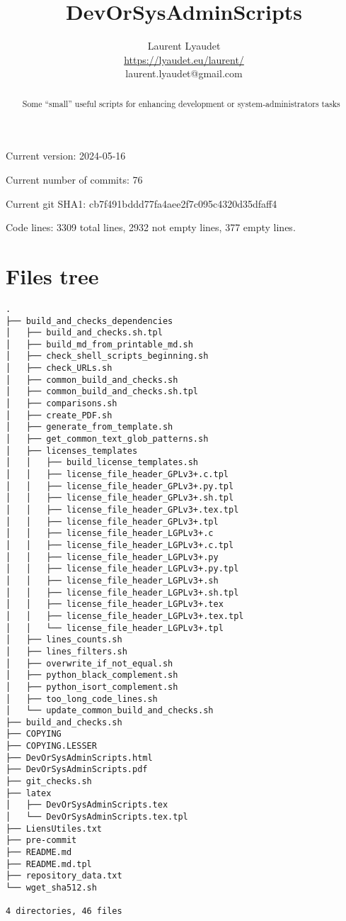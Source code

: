 \documentclass{article}
\begin{document}
\author{
  Laurent Lyaudet\\
  \url{https://lyaudet.eu/laurent/}\\
  laurent.lyaudet@gmail.com
}
\title{DevOrSysAdminScripts}

\maketitle
\begin{abstract}
Some ``small'' useful scripts
for enhancing development or system-administrators tasks
\end{abstract}

Current version: 2024-05-16

Current number of commits: 76

Current git SHA1: cb7f491bddd77fa4aee2f7c095c4320d35dfaff4

Code lines: 3309 total lines, 2932 not empty lines, 377 empty lines.

\section{Files tree}
\label{section:tree}

\begin{verbatim}
.
├── build_and_checks_dependencies
│   ├── build_and_checks.sh.tpl
│   ├── build_md_from_printable_md.sh
│   ├── check_shell_scripts_beginning.sh
│   ├── check_URLs.sh
│   ├── common_build_and_checks.sh
│   ├── common_build_and_checks.sh.tpl
│   ├── comparisons.sh
│   ├── create_PDF.sh
│   ├── generate_from_template.sh
│   ├── get_common_text_glob_patterns.sh
│   ├── licenses_templates
│   │   ├── build_license_templates.sh
│   │   ├── license_file_header_GPLv3+.c.tpl
│   │   ├── license_file_header_GPLv3+.py.tpl
│   │   ├── license_file_header_GPLv3+.sh.tpl
│   │   ├── license_file_header_GPLv3+.tex.tpl
│   │   ├── license_file_header_GPLv3+.tpl
│   │   ├── license_file_header_LGPLv3+.c
│   │   ├── license_file_header_LGPLv3+.c.tpl
│   │   ├── license_file_header_LGPLv3+.py
│   │   ├── license_file_header_LGPLv3+.py.tpl
│   │   ├── license_file_header_LGPLv3+.sh
│   │   ├── license_file_header_LGPLv3+.sh.tpl
│   │   ├── license_file_header_LGPLv3+.tex
│   │   ├── license_file_header_LGPLv3+.tex.tpl
│   │   └── license_file_header_LGPLv3+.tpl
│   ├── lines_counts.sh
│   ├── lines_filters.sh
│   ├── overwrite_if_not_equal.sh
│   ├── python_black_complement.sh
│   ├── python_isort_complement.sh
│   ├── too_long_code_lines.sh
│   └── update_common_build_and_checks.sh
├── build_and_checks.sh
├── COPYING
├── COPYING.LESSER
├── DevOrSysAdminScripts.html
├── DevOrSysAdminScripts.pdf
├── git_checks.sh
├── latex
│   ├── DevOrSysAdminScripts.tex
│   └── DevOrSysAdminScripts.tex.tpl
├── LiensUtiles.txt
├── pre-commit
├── README.md
├── README.md.tpl
├── repository_data.txt
└── wget_sha512.sh

4 directories, 46 files
\end{verbatim}
\end{document}
